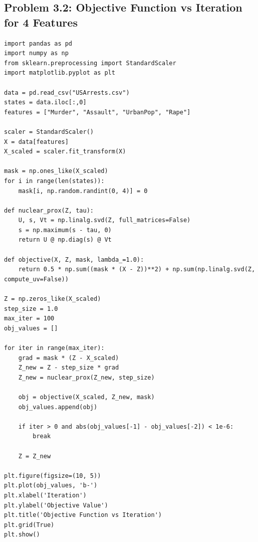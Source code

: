 \documentclass[11pt]{article}
\begin{document}
\subsection{Problem 3.2: Objective Function vs Iteration for 4 Features}
\begin{verbatim}
import pandas as pd
import numpy as np
from sklearn.preprocessing import StandardScaler
import matplotlib.pyplot as plt

data = pd.read_csv("USArrests.csv")
states = data.iloc[:,0]
features = ["Murder", "Assault", "UrbanPop", "Rape"]

scaler = StandardScaler()
X = data[features]
X_scaled = scaler.fit_transform(X)

mask = np.ones_like(X_scaled)
for i in range(len(states)):
    mask[i, np.random.randint(0, 4)] = 0

def nuclear_prox(Z, tau):
    U, s, Vt = np.linalg.svd(Z, full_matrices=False)
    s = np.maximum(s - tau, 0)
    return U @ np.diag(s) @ Vt

def objective(X, Z, mask, lambda_=1.0):
    return 0.5 * np.sum((mask * (X - Z))**2) + np.sum(np.linalg.svd(Z, compute_uv=False))

Z = np.zeros_like(X_scaled)
step_size = 1.0
max_iter = 100
obj_values = []

for iter in range(max_iter):
    grad = mask * (Z - X_scaled)
    Z_new = Z - step_size * grad
    Z_new = nuclear_prox(Z_new, step_size)
    
    obj = objective(X_scaled, Z_new, mask)
    obj_values.append(obj)
    
    if iter > 0 and abs(obj_values[-1] - obj_values[-2]) < 1e-6:
        break
    
    Z = Z_new

plt.figure(figsize=(10, 5))
plt.plot(obj_values, 'b-')
plt.xlabel('Iteration')
plt.ylabel('Objective Value')
plt.title('Objective Function vs Iteration')
plt.grid(True)
plt.show()
\end{verbatim}
\end{document}
